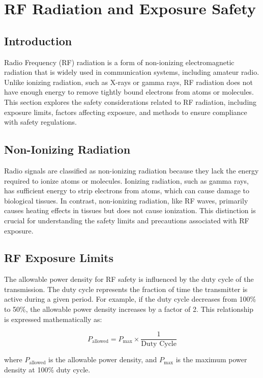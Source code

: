 \section{RF Radiation and Exposure Safety}
\label{section:rf_safety}

\subsection*{Introduction}
Radio Frequency (RF) radiation is a form of non-ionizing electromagnetic radiation that is widely used in communication systems, including amateur radio. Unlike ionizing radiation, such as X-rays or gamma rays, RF radiation does not have enough energy to remove tightly bound electrons from atoms or molecules. This section explores the safety considerations related to RF radiation, including exposure limits, factors affecting exposure, and methods to ensure compliance with safety regulations.

\subsection*{Non-Ionizing Radiation}
Radio signals are classified as non-ionizing radiation because they lack the energy required to ionize atoms or molecules. Ionizing radiation, such as gamma rays, has sufficient energy to strip electrons from atoms, which can cause damage to biological tissues. In contrast, non-ionizing radiation, like RF waves, primarily causes heating effects in tissues but does not cause ionization. This distinction is crucial for understanding the safety limits and precautions associated with RF exposure.

\subsection*{RF Exposure Limits}
The allowable power density for RF safety is influenced by the duty cycle of the transmission. The duty cycle represents the fraction of time the transmitter is active during a given period. For example, if the duty cycle decreases from 100\% to 50\%, the allowable power density increases by a factor of 2. This relationship is expressed mathematically as:

\begin{equation}
P_{\text{allowed}} = P_{\text{max}} \times \frac{1}{\text{Duty Cycle}}
\end{equation}

where \(P_{\text{allowed}}\) is the allowable power density, and \(P_{\text{max}}\) is the maximum power density at 100\% duty cycle.

